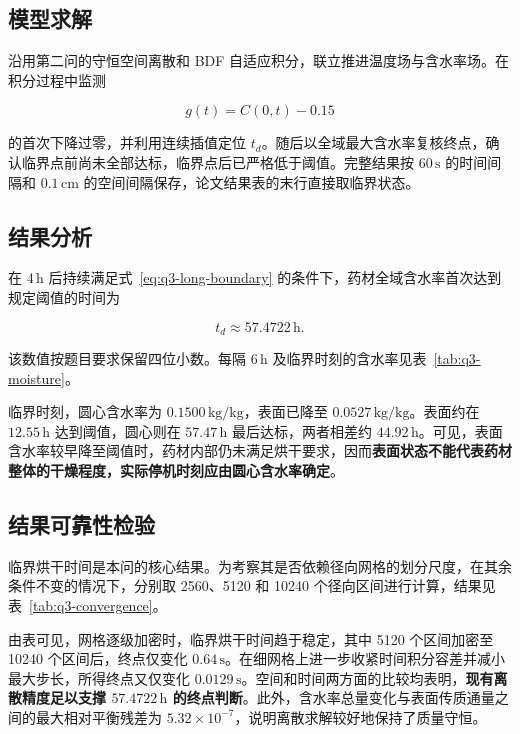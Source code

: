 \subsection{模型求解}

沿用第二问的守恒空间离散和 BDF 自适应积分，联立推进温度场与含水率场。在积分过程中监测

\[
  g(t)=C(0,t)-0.15
\]

的首次下降过零，并利用连续插值定位 $t_d$。随后以全域最大含水率复核终点，确认临界点前尚未全部达标，临界点后已严格低于阈值。完整结果按 $60\,\mathrm s$ 的时间间隔和 $0.1\,\mathrm{cm}$ 的空间间隔保存，论文结果表的末行直接取临界状态。

\subsection{结果分析}

在 $4\,\mathrm h$ 后持续满足式~\eqref{eq:q3-long-boundary} 的条件下，药材全域含水率首次达到规定阈值的时间为

\[
  \boxed{t_d\approx57.4722\,\mathrm h}.
\]

该数值按题目要求保留四位小数。每隔 $6\,\mathrm h$ 及临界时刻的含水率见表~\ref{tab:q3-moisture}。



临界时刻，圆心含水率为 $0.1500\,\mathrm{kg/kg}$，表面已降至 $0.0527\,\mathrm{kg/kg}$。表面约在 $12.55\,\mathrm h$ 达到阈值，圆心则在 $57.47\,\mathrm h$ 最后达标，两者相差约 $44.92\,\mathrm h$。可见，表面含水率较早降至阈值时，药材内部仍未满足烘干要求，因而\textbf{表面状态不能代表药材整体的干燥程度，实际停机时刻应由圆心含水率确定}。

\subsection{结果可靠性检验}

临界烘干时间是本问的核心结果。为考察其是否依赖径向网格的划分尺度，在其余条件不变的情况下，分别取 2560、5120 和 10240 个径向区间进行计算，结果见表~\ref{tab:q3-convergence}。



由表可见，网格逐级加密时，临界烘干时间趋于稳定，其中 5120 个区间加密至 10240 个区间后，终点仅变化 $0.64\,\mathrm s$。在细网格上进一步收紧时间积分容差并减小最大步长，所得终点又仅变化 $0.0129\,\mathrm s$。空间和时间两方面的比较均表明，\textbf{现有离散精度足以支撑 $57.4722\,\mathrm h$ 的终点判断}。此外，含水率总量变化与表面传质通量之间的最大相对平衡残差为 $5.32\times10^{-7}$，说明离散求解较好地保持了质量守恒。

